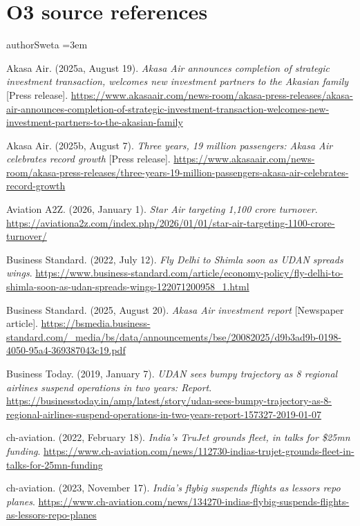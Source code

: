 \section*{O3 source references}
\begin{mergedcontribution}{authorSweta}
\begingroup\small{}\sloppy\emergencystretch=3em\def\UrlBreaks{\do\/\do\-\do\_\do\?\do\=\do\&\do\.\do\%}
\setlength{\parindent}{-0.5in}\setlength{\leftskip}{0.5in}\setlength{\parskip}{4pt}

Akasa Air. (2025a, August 19). \textit{Akasa Air announces completion of strategic investment transaction, welcomes new investment partners to the Akasian family} [Press release]. \url{https://www.akasaair.com/news-room/akasa-press-releases/akasa-air-announces-completion-of-strategic-investment-transaction-welcomes-new-investment-partners-to-the-akasian-family}

Akasa Air. (2025b, August 7). \textit{Three years, 19 million passengers: Akasa Air celebrates record growth} [Press release]. \url{https://www.akasaair.com/news-room/akasa-press-releases/three-years-19-million-passengers-akasa-air-celebrates-record-growth}

Aviation A2Z. (2026, January 1). \textit{Star Air targeting 1,100 crore turnover}. \url{https://aviationa2z.com/index.php/2026/01/01/star-air-targeting-1100-crore-turnover/}

Business Standard. (2022, July 12). \textit{Fly Delhi to Shimla soon as UDAN spreads wings}. \url{https://www.business-standard.com/article/economy-policy/fly-delhi-to-shimla-soon-as-udan-spreads-wings-122071200958_1.html}

Business Standard. (2025, August 20). \textit{Akasa Air investment report} [Newspaper article]. \url{https://bsmedia.business-standard.com/_media/bs/data/announcements/bse/20082025/d9b3ad9b-0198-4050-95a4-369387043c19.pdf}

Business Today. (2019, January 7). \textit{UDAN sees bumpy trajectory as 8 regional airlines suspend operations in two years: Report}. \url{https://businesstoday.in/amp/latest/story/udan-sees-bumpy-trajectory-as-8-regional-airlines-suspend-operations-in-two-years-report-157327-2019-01-07}

ch-aviation. (2022, February 18). \textit{India's TruJet grounds fleet, in talks for \$25mn funding}. \url{https://www.ch-aviation.com/news/112730-indias-trujet-grounds-fleet-in-talks-for-25mn-funding}

ch-aviation. (2023, November 17). \textit{India's flybig suspends flights as lessors repo planes}. \url{https://www.ch-aviation.com/news/134270-indias-flybig-suspends-flights-as-lessors-repo-planes}


\end{mergedcontribution}
